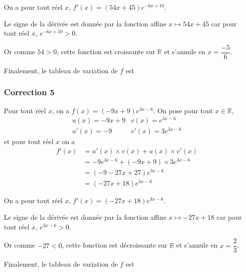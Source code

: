 \documentclass[15pt, mathserif]{beamer}
\begin{document}
\begin{frame}On a pour tout réel $x$, $f'(x) = (54x+45)e^{-6x+10}$.

Le signe de la dérivée est donnée par la fonction affine $x \mapsto 54x+45$ car pour tout réel $x$, $e^{-6x+10}>0$.

Or comme $54>0$, cette fonction est croissante sur $\mathbb{R}$ et s'annule en $x = \dfrac{-5}{6}$.

Finalement, le tableau de variation de $f$ est

\hfil{}\end{frame}


\begin{frame}
\vspace{-10mm}
	\frametitle{Correction 5}
Pour tout réel $x$, on a $f(x) =(-9x+9)e^{3x-6}$. On pose pour tout $x \in \mathbb{R}$,\[\begin{matrix}u(x) = -9x+9& v(x) = e^{3x-6}\\ u'(x) = -9& v'(x) = 3e^{3x-6}\end{matrix}\]et pour tout réel $x$ on a \begin{align*}f'(x)&= u'(x) \times v(x) + u(x) \times v'(x) \\ &=-9e^{3x-6}+(-9x+9)\times 3 e^{3x-6} \\
	 &= (-9-27x+27)e^{3x-6} \\
	 &= (-27x+18)e^{3x-6}
\end{align*}

\end{frame}

\begin{frame}On a pour tout réel $x$, $f'(x) = (-27x+18)e^{3x-6}$.

Le signe de la dérivée est donnée par la fonction affine $x \mapsto -27x+18$ car pour tout réel $x$, $e^{3x-6}>0$.

Or comme $-27<0$, cette fonction est décroissante sur $\mathbb{R}$ et s'annule en $x = \dfrac{2}{3}$.

Finalement, le tableau de variation de $f$ est

\hfil{}\end{frame}
\end{document}
